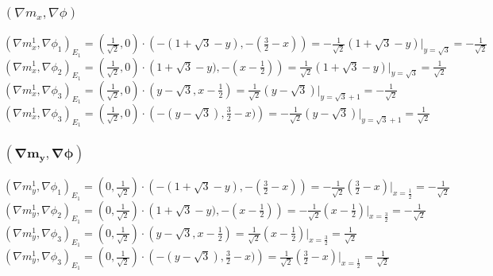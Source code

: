 \documentclass{article}
\begin{document}
\subsubsection{$(\nabla m_x,\nabla\phi)$}
$(\nabla m_x^1,\nabla\phi_1)_{E_1} = 
\left(\frac{1}{\sqrt{2}},0\right)\cdot\left(-(1 + \sqrt{3} - y),  -(\frac{3}{2}-x)\right) = 
-\frac{1}{\sqrt{2}}(1 + \sqrt{3} - y)|_{y=\sqrt{3}} = 
-\frac{1}{\sqrt{2}}$\\
$(\nabla m_x^1,\nabla\phi_2)_{E_1} = 
\left(\frac{1}{\sqrt{2}},0\right)\cdot\left(1 + \sqrt{3} - y),  -(x-\frac{1}{2})\right) = 
\frac{1}{\sqrt{2}}(1 + \sqrt{3} - y)|_{y=\sqrt{3}} = 
\frac{1}{\sqrt{2}}$\\
$(\nabla m_x^1,\nabla\phi_3)_{E_1} = 
\left(\frac{1}{\sqrt{2}},0\right)\cdot\left(y-\sqrt{3}, x-\frac{1}{2}\right) = 
\frac{1}{\sqrt{2}}(y-\sqrt{3})|_{y=\sqrt{3}+1} = 
-\frac{1}{\sqrt{2}}$\\
$(\nabla m_x^1,\nabla\phi_3)_{E_1} = 
\left(\frac{1}{\sqrt{2}},0\right)\cdot\left(-(y-\sqrt{3}), \frac{3}{2}-x)\right) = 
-\frac{1}{\sqrt{2}}(y-\sqrt{3})|_{y=\sqrt{3}+1} = 
\frac{1}{\sqrt{2}}$\\


\subsubsection{$\mathbf{(\nabla m_y,\nabla\phi)}$}
$(\nabla m_y^1,\nabla\phi_1)_{E_1} = 
\left(0,\frac{1}{\sqrt{2}}\right)\cdot\left(-(1 + \sqrt{3} - y),  -(\frac{3}{2}-x)\right) = 
-\frac{1}{\sqrt{2}}(\frac{3}{2}-x)|_{x=\frac{1}{2}} = 
-\frac{1}{\sqrt{2}}$\\
$(\nabla m_y^1,\nabla\phi_2)_{E_1} = 
\left(0,\frac{1}{\sqrt{2}}\right)\cdot\left(1 + \sqrt{3} - y),  -(x-\frac{1}{2})\right) = 
-\frac{1}{\sqrt{2}}(x - \frac{1}{2})|_{x=\frac{3}{2}} = 
-\frac{1}{\sqrt{2}}$\\
$(\nabla m_y^1,\nabla\phi_3)_{E_1} = 
\left(0,\frac{1}{\sqrt{2}}\right)\cdot\left(y-\sqrt{3}, x-\frac{1}{2}\right) = 
\frac{1}{\sqrt{2}}(x-\frac{1}{2})|_{x=\frac{3}{2}} = 
\frac{1}{\sqrt{2}}$\\
$(\nabla m_y^1,\nabla\phi_3)_{E_1} = 
\left(0,\frac{1}{\sqrt{2}}\right)\cdot\left(-(y-\sqrt{3}), \frac{3}{2}-x)\right) = 
\frac{1}{\sqrt{2}}(\frac{3}{2}-x)|_{x=\frac{1}{2}} = 
\frac{1}{\sqrt{2}}$\\
\end{document}
